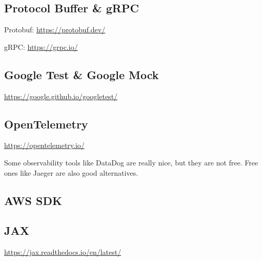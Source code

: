 \documentclass{article}
\begin{document}
\subsection{Protocol Buffer \& gRPC}
Protobuf:
\href{https://protobuf.dev/}{https://protobuf.dev/}

gRPC:
\href{https://grpc.io/}{https://grpc.io/}
\subsection{Google Test \& Google Mock}
\href{https://google.github.io/googletest/}{https://google.github.io/googletest/}
\subsection{OpenTelemetry}
\href{https://opentelemetry.io/}{https://opentelemetry.io/}

Some observability tools like DataDog are really nice, but they are not free.
Free ones like Jaeger are also good alternatives.
\subsection{AWS SDK}
\subsection{JAX}
\href{https://jax.readthedocs.io/en/latest/}{https://jax.readthedocs.io/en/latest/}
\end{document}
